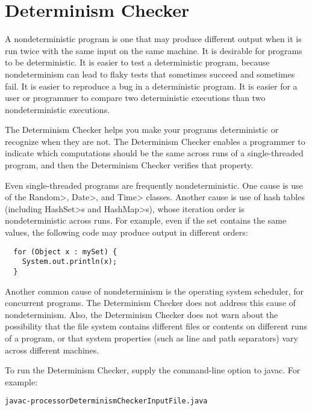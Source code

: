 \htmlhr
\chapter{Determinism Checker\label{determinism-checker}}

A nondeterministic program is one that may produce different output when
it is run twice with the same input on the same machine.
It is desirable for programs to be deterministic.
It is easier to test a deterministic program, because nondeterminism can
lead to flaky tests that sometimes succeed and sometimes fail.
It is easier to reproduce a bug in a deterministic program.
It is easier for a user or programmer to compare two
deterministic executions than two nondeterministic executions.

The Determinism Checker helps you make your programs deterministic or
recognize when they are not.
The Determinism Checker enables a programmer to indicate which
computations should be the same across runs of a single-threaded program,
and then the Determinism Checker verifies that property.

Even single-threaded programs are frequently nondeterministic.
One cause is use of the \<Random>, \<Date>, and \<Time> classes.
Another cause is use of hash tables (including \<HashSet>s and
\<HashMap>s), whose iteration order is nondeterministic across runs.
For example, even if the set contains the same values, the following code
may produce output in different orders:

\begin{Verbatim}
  for (Object x : mySet) {
    System.out.println(x);
  }
\end{Verbatim}

Another common cause of nondeterminism is the operating system scheduler,
for concurrent programs.  The Determinism Checker does not address this
cause of nondeterminism.  Also, the Determinism Checker does not warn
about the possibility that the file system contains different files or
contents on different runs of a program, or that system properties (such as
line and path separators) vary across different machines.

To run the Determinism Checker, supply the
command-line option to javac.
For example:

\begin{alltt}
  javac -processor DeterminismChecker InputFile.java
\end{alltt}



